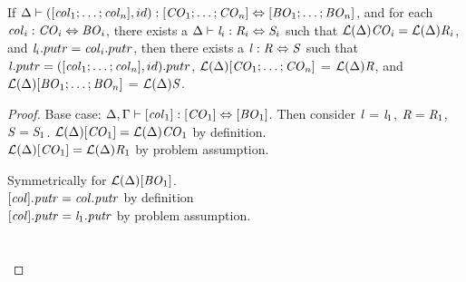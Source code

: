 \begin{lemma}
\label{lem:id-dnf}
If $\Delta \vdash ([\mathit{col}_1 ; \ldots ; \mathit{col}_n],id) : [\mathit{CO}_1 ; \ldots ; \mathit{CO}_n] \Leftrightarrow [\mathit{BO}_1 ; \ldots ; \mathit{BO}_n]$,
and for each $\mathit{col}_i : \mathit{CO}_i \Leftrightarrow \mathit{BO}_i$,
there exists a $\Delta \vdash \mathit{l}_i : \mathit{R}_i \Leftrightarrow \mathit{S}_i$ such that
$\mathcal{L}(\Delta){\mathit{CO}_i}=\mathcal{L}(\Delta){\mathit{R}_i}$, and $\mathit{l}_i.putr = \mathit{col}_i.putr$,
then there exists a $\mathit{l} : \mathit{R} \Leftrightarrow \mathit{S}$ such that $\mathit{l}.putr = ([\mathit{col}_1 ; \ldots ; \mathit{col}_n],id).putr$, $\mathcal{L}(\Delta){[\mathit{CO}_1 ; \ldots ; \mathit{CO}_n]}$ = $\mathcal{L}(\Delta){\mathit{R}}$,
and $\mathcal{L}(\Delta){[\mathit{BO}_1 ; \ldots ; \mathit{BO}_n]}$ = $\mathcal{L}(\Delta){\mathit{S}}$.
\begin{proof}
Base case: $\Delta, \Gamma \vdash [\mathit{col}_1] : [\mathit{CO}_1] \Leftrightarrow [\mathit{BO}_1]$.  Then consider $\mathit{l}$ = $\mathit{l}_1$, $\mathit{R} = \mathit{R}_1$, $\mathit{S} = \mathit{S}_1$.
$\mathcal{L}(\Delta){[\mathit{CO}_1]} = \mathcal{L}(\Delta){\mathit{CO}_1}$ by definition.\\
$\mathcal{L}(\Delta){[\mathit{CO}_1]} = \mathcal{L}(\Delta){\mathit{R}_1}$ by problem assumption.

Symmetrically for $\mathcal{L}(\Delta){[\mathit{BO}_1]}$.\\
$[\mathit{col}].\mathit{putr} = \mathit{col}.\mathit{putr}$ by definition\\
$[\mathit{col}].\mathit{putr} = \mathit{l}_1.\mathit{putr}$ by problem assumption.
\\\\\\




\end{proof}
\end{lemma}
